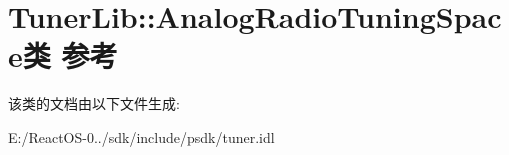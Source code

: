 \hypertarget{class_tuner_lib_1_1_analog_radio_tuning_space}{}\section{Tuner\+Lib\+:\+:Analog\+Radio\+Tuning\+Space类 参考}
\label{class_tuner_lib_1_1_analog_radio_tuning_space}


该类的文档由以下文件生成\+:\begin{DoxyCompactItemize}
\item 
E\+:/\+React\+O\+S-\/0../sdk/include/psdk/tuner.\+idl\end{DoxyCompactItemize}
